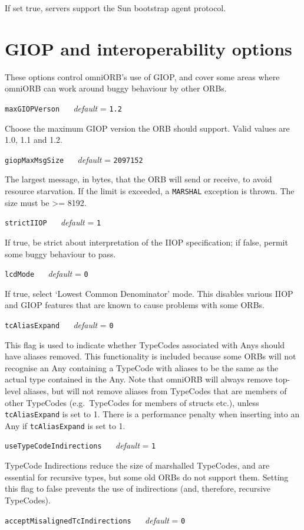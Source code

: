 \documentclass[draft,11pt,twoside,a4paper]{book}
\makeatletter
\newcommand{\code}[1]{\texttt{#1}}
\newcommand{\confopt}[2]
  {\vspace{\baselineskip}\par\noindent\code{#1} ~~ \textit{default} =
   \code{#2}\\[-1ex]\@afterheading}
\makeatother
\begin{document}
If set true, servers support the Sun bootstrap agent protocol.



\section{GIOP and interoperability options}

These options control omniORB's use of GIOP, and cover some areas
where omniORB can work around buggy behaviour by other ORBs.


\confopt{maxGIOPVerson}{1.2}

Choose the maximum GIOP version the ORB should support. Valid values
are 1.0, 1.1 and 1.2.


\confopt{giopMaxMsgSize}{2097152}

The largest message, in bytes, that the ORB will send or receive, to
avoid resource starvation. If the limit is exceeded, a \code{MARSHAL}
exception is thrown. The size must be >= 8192.

\confopt{strictIIOP}{1}

If true, be strict about interpretation of the IIOP specification; if
false, permit some buggy behaviour to pass.


\confopt{lcdMode}{0}

If true, select `Lowest Common Denominator' mode. This disables
various IIOP and GIOP features that are known to cause problems with
some ORBs.


\confopt{tcAliasExpand}{0}

This flag is used to indicate whether TypeCodes associated with Anys
should have aliases removed. This functionality is included because
some ORBs will not recognise an Any containing a TypeCode with aliases
to be the same as the actual type contained in the Any. Note that
omniORB will always remove top-level aliases, but will not remove
aliases from TypeCodes that are members of other TypeCodes (e.g.\
TypeCodes for members of structs etc.), unless \code{tcAliasExpand} is
set to 1. There is a performance penalty when inserting into an Any if
\code{tcAliasExpand} is set to 1.


\confopt{useTypeCodeIndirections}{1}

TypeCode Indirections reduce the size of marshalled TypeCodes, and are
essential for recursive types, but some old ORBs do not support them.
Setting this flag to false prevents the use of indirections (and,
therefore, recursive TypeCodes).


\confopt{acceptMisalignedTcIndirections}{0}
\end{document}
